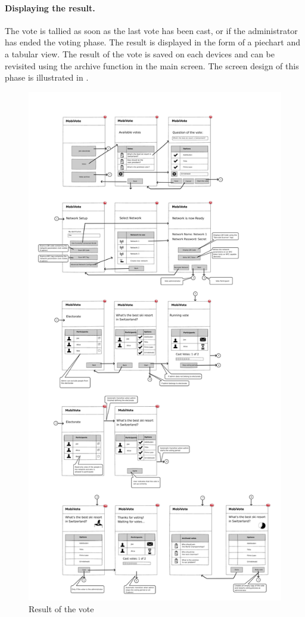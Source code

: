 \documentclass[numbers=noenddot, abstract=on, a4paper, headsepline,
footsepline, oneside, draft=off]{scrreprt}
\begin{document}
\paragraph{Displaying the result.}
The vote is tallied as soon as the last vote has been cast, or if the
administrator has ended the voting phase. The result is displayed in the form of
a piechart and a tabular view. The result of the vote is saved on each devices
and can be revisited using the archive function in the main screen. The screen
design of this phase is illustrated in .

\begin{figure}[htbp]
	\centering
	\includegraphics[height=.4\textheight]{img/result}
	\caption{Result of the vote}
	\label{fig:result}
\end{figure}
\end{document}
